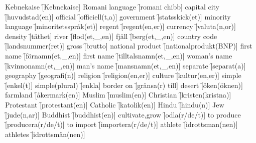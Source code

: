 \begin{questions}
\begin{multicols}{2}
        \question Kebnekaise \f[Kebnekaise]
        \question Romani language \f[romani chibb]
        \question capital city \f[huvudstad(en)]
        \question official \f[officiell(t,a)]
        \question government \f[statsskick(et)]
        \question minority language \f[minoritetsspråk(et)]
        \question regent \f[regent(en,er)]
        \question currency \f[valuta(n,or)]
        \question density \f[täthet]
        \question river \f[flod(et,\_,en)]
        \question fjäll \f[berg(et,\_,en)]
        \question country code \f[landsnummer(ret)]
        \question gross \f[brutto]
        \question national product \f[nationalprodukt(BNP)]
        \question first name \f[förnamn(et,\_,en)]
        \question first name \f[tilltalsnamn(et,\_,en)]
        \question woman's name \f[kvinnonamn(et,\_,en)]
        \question man's name \f[mansnamn(et,\_,en)]
        \question separate \f[separat(a)]
        \question geography \f[geografi(n)]
        \question religion \f[religion(en,er)]
        \question culture \f[kultur(en,er)]
        \question simple \f[enkel(t)]
        \question simple(plural) \f[enkla]
        \question border on \f[gränsa(r) till]
        \question desert \f[öken(öknen)]
        \question farmland \f[åkermark(en)]
        \question Muslim \f[muslim(en)]
        \question Christian \f[kristen(kristna)]
        \question Protestant \f[protestant(en)]
        \question Catholic \f[katolik(en)]
        \question Hindu \f[hindu(n)]
        \question Jew \f[jude(n,ar)]
        \question Buddhist \f[buddhist(en)]
        \question cultivate,grow \f[odla(r/de/t)]
        \question to produce \f[producera(r/de/t)]
        \question to import \f[importera(r/de/t)]
        \question athlete \f[idrottsman(nen)]
        \question athletes \f[idrottsmän(nen)]
    \end{multicols}
\end{questions}
